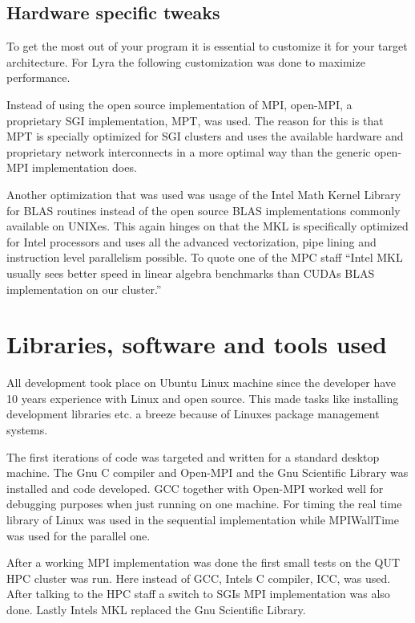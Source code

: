 \documentclass{article}
\begin{document}
\subsection{Hardware specific tweaks}
To get the most out of your program it is essential to customize it for your target architecture.
For Lyra the following customization was done to maximize performance.

Instead of using the open source implementation of MPI, open-MPI, a proprietary SGI
implementation, MPT, was used. The reason for this is that MPT is specially optimized
for SGI clusters and uses the available hardware and proprietary network interconnects
in a more optimal way than the generic open-MPI implementation does.

Another optimization that was used was usage of the Intel Math Kernel Library\cite{mkl} for
BLAS\cite{blas} routines instead of the open source BLAS implementations commonly available
on UNIXes. This again hinges on that the MKL is specifically optimized for Intel processors
and uses all the advanced vectorization, pipe lining and instruction level parallelism
possible. To quote one of the MPC staff ``Intel MKL usually sees better speed in linear
algebra benchmarks than CUDAs BLAS implementation on our cluster.''


\section{Libraries, software and tools used}
All development took place on Ubuntu Linux machine since the developer
have 10 years experience with Linux and open source. This made tasks like
installing development libraries etc. a breeze because of Linuxes package
management systems.

The first iterations of code was targeted and written for a standard
desktop machine. The Gnu C compiler and Open-MPI and the Gnu Scientific Library
was installed and code developed. GCC together with Open-MPI worked well for
debugging purposes when just running on one machine. For timing the real time
library of Linux was used in the sequential implementation while MPI\textunderscore WallTime
was used for the parallel one.

After a working MPI implementation was done the first small tests on the
QUT HPC cluster was run. Here instead of GCC, Intels C compiler, ICC, was used.
After talking to the HPC staff a switch to SGIs MPI implementation was also done.
Lastly Intels MKL replaced the Gnu Scientific Library.
\end{document}
